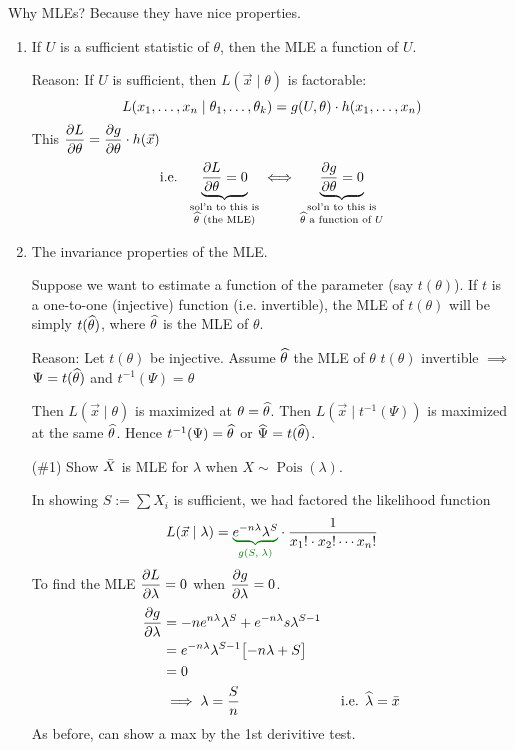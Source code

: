\disc Why MLEs? Because they have nice properties.
\begin{enumerate}[label=\textcircled{\raisebox{-1pt}{\arabic*}}]
    \item If $U$ is a sufficient statistic of $\theta$, then the MLE  a function of $U$.
    
    \nl Reason: If $U$ is sufficient, then $L(\vec{x} \mid \theta)$ is factorable:
    $$L({x}_1, \dots, {x}_n \mid \theta_1, \dots, \theta_k) = g(U, \theta) \cdot h({x}_1, \dots, {x}_n)$$
    This $\displaystyle \pdv{L}{\theta} = \pdv{g}{\theta} \cdot h(\vec{x})$ 
    $$\text{i.e. }\; \underbrace{ \pdv{L}{\theta} = 0 }_{  
        \substack{ \text{sol'n to this is} \\ \widehat{\theta} \text{ (the MLE)} }
    } \iff \underbrace{\pdv{g}{\theta} = 0}_{
        \substack{\text{sol'n to this is} \\ \widehat{\theta} \text{ a function of } U}
    }$$

    \item The invariance properties of the MLE.
    
    \nl Suppose we want to estimate a function of the parameter (say $t(\theta)$). If $t$ is a one-to-one (injective) function (i.e. invertible), the MLE of $t(\theta)$ will be simply $t(\widehat{\theta})$, where $\widehat{\theta}$ is the MLE of $\theta$.

    \nl Reason: Let $t(\theta)$ be injective. Assume $\widehat{\theta}$ the MLE of $\theta$ $t(\theta)$ invertible $\implies$ $\Psi = t(\widehat{\theta})$ and $t^{-1}(\Psi) = \theta$

    \nl Then $L(\vec{x} \mid \theta)$ is maximized at $\theta = \widehat{\theta}$. Then $L(\vec{x} \mid t^{-1}(\Psi))$ is maximized at the same $\widehat{\theta}$. Hence $t^{-1}(\Psi) = \widehat{\theta}$ or $\widehat{\Psi} = t(\widehat{\theta})$.

    \example (\#1) Show $\bar{X}$ is MLE for $\lambda$ when $X \sim \operatorname{Pois}(\lambda)$. 

    \nl In showing $S := \sum X_i$ is sufficient, we had factored the likelihood function 
    $$L(\vec{x} \mid \lambda) = \green{\underbrace{\setBlack e^{-n \lambda}\lambda^S}_{g(S,\;\lambda)}}  \cdot \over{x_1! \cdot x_2! \cdots x_n!}$$
    To find the MLE $\displaystyle \pdv{L}{\lambda} = 0$ when $\displaystyle \pdv{g}{\lambda} = 0$.
    \begin{align*}
        \pdv{g}{\lambda} &= -ne^{n\lambda} \lambda^S + e^{-n\lambda} s\lambda^{S-1}\\
        &= e^{-n\lambda}\lambda^{S-1}\big[ {-n\lambda + S} \big]\\
        &= 0\\
        &\implies \lambda = \frac{S}{n} \hspace{1in} \text{i.e. } \widehat{\lambda} = \bar{x}
    \end{align*}
    As before, can show a max by the 1st derivitive test.


\end{enumerate}

